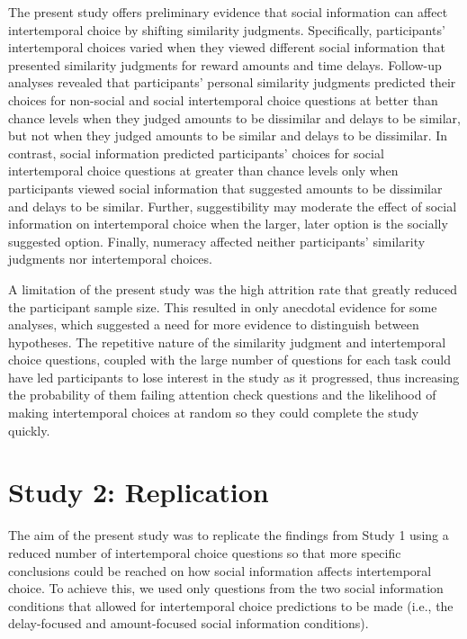 \documentclass[
  pub,floatsintext]{apa6}
\begin{document}
The present study offers preliminary evidence that social information can affect intertemporal choice by shifting similarity judgments. Specifically, participants' intertemporal choices varied when they viewed different social information that presented similarity judgments for reward amounts and time delays. Follow-up analyses revealed that participants' personal similarity judgments predicted their choices for non-social and social intertemporal choice questions at better than chance levels when they judged amounts to be dissimilar and delays to be similar, but not when they judged amounts to be similar and delays to be dissimilar. In contrast, social information predicted participants' choices for social intertemporal choice questions at greater than chance levels only when participants viewed social information that suggested amounts to be dissimilar and delays to be similar. Further, suggestibility may moderate the effect of social information on intertemporal choice when the larger, later option is the socially suggested option. Finally, numeracy affected neither participants' similarity judgments nor intertemporal choices.

A limitation of the present study was the high attrition rate that greatly reduced the participant sample size. This resulted in only anecdotal evidence for some analyses, which suggested a need for more evidence to distinguish between hypotheses. The repetitive nature of the similarity judgment and intertemporal choice questions, coupled with the large number of questions for each task could have led participants to lose interest in the study as it progressed, thus increasing the probability of them failing attention check questions and the likelihood of making intertemporal choices at random so they could complete the study quickly.

\hypertarget{study-2-replication}{%
\section{Study 2: Replication}\label{study-2-replication}}

The aim of the present study was to replicate the findings from Study 1 using a reduced number of intertemporal choice questions so that more specific conclusions could be reached on how social information affects intertemporal choice. To achieve this, we used only questions from the two social information conditions that allowed for intertemporal choice predictions to be made (i.e., the delay-focused and amount-focused social information conditions).
\end{document}
